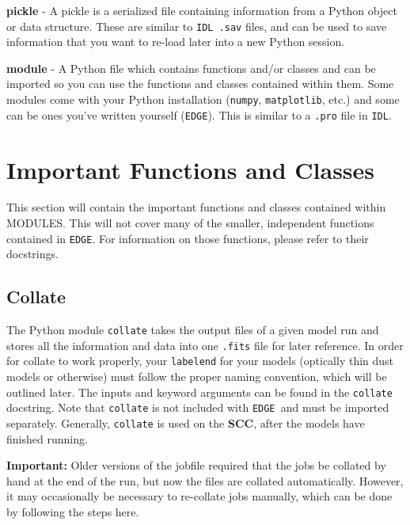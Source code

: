 \documentclass{article}
\newcommand{\edge}{\texttt{EDGE }}
\begin{document}
\noindent \textbf{pickle} - A pickle is a serialized file containing information from a Python object or data structure. These are similar to \texttt{IDL .sav} files, and can be used to save information that you want to re-load later into a new Python session. 
 
\noindent \textbf{module} - A Python file which contains functions and/or classes and can be imported so you can use the functions and classes contained within them. Some modules come with your Python installation (\texttt{numpy}, \texttt{matplotlib}, etc.) and some can be ones you’ve written yourself (\texttt{EDGE}). This is similar to a \texttt{.pro} file in \texttt{IDL}. 
 

 
\section{Important Functions and Classes} \label{functions}

This section will contain the important functions and classes contained within MODULES. This will not cover many of the smaller, independent functions contained in \texttt{EDGE}. For information on those functions, please refer to their docstrings. 
 
\subsection{Collate}
 
The Python module \texttt{collate} takes the output files of a given model run and stores all the information and data into one \texttt{.fits} file for later reference. In order for collate to work properly, your \texttt{labelend} for your models (optically thin dust models or otherwise) must follow the proper naming convention, which will be outlined later. The inputs and keyword arguments can be found in the \texttt{collate} docstring. Note that \texttt{collate} is not included with \edge and must be imported separately. 
Generally, \texttt{collate} is used on the \textbf{SCC}, after the models have finished running. 

\vspace{2mm}
\noindent \textbf{Important:} Older versions of the jobfile required that the jobs be collated by hand at the end of the run, but now the files are collated automatically. However, it may occasionally be necessary to re-collate jobs manually, which can be done by following the steps here.
\vspace{2mm}
\end{document}
